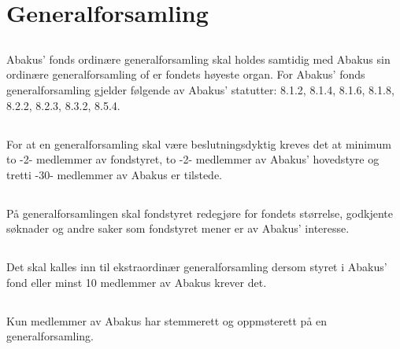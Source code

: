 \section{Generalforsamling}

\subsection{}
Abakus’ fonds ordinære generalforsamling skal holdes samtidig med Abakus sin
ordinære generalforsamling of er fondets høyeste organ. For Abakus’ fonds
generalforsamling gjelder følgende av Abakus’ statutter: 8.1.2, 8.1.4, 8.1.6,
8.1.8, 8.2.2, 8.2.3, 8.3.2, 8.5.4.

\subsection{}
For at en generalforsamling skal være beslutningsdyktig kreves det at minimum
to -2- medlemmer av fondstyret, to -2- medlemmer av Abakus’ hovedstyre ​og tretti
-30- medlemmer av Abakus er tilstede.

\subsection{}
På generalforsamlingen skal fondstyret redegjøre for fondets størrelse,
godkjente søknader og andre saker som fondstyret mener er av Abakus’
interesse. 

\subsection{}
Det skal kalles inn til ekstraordinær generalforsamling dersom styret i
Abakus’ fond eller minst 10 medlemmer av Abakus krever det.

\subsection{}
Kun medlemmer av Abakus har stemmerett og oppmøterett på en generalforsamling.
